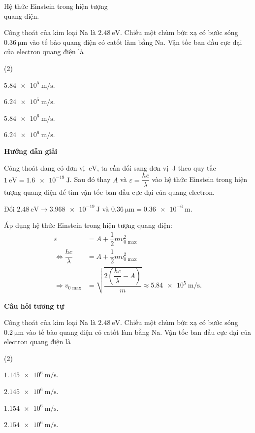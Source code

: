 \begin{dang}{Hệ thức Einstein trong hiện tượng\\ quang điện.}


{Công thoát của kim loại Na là $\SI{2.48}{\electronvolt}$. Chiếu một chùm bức xạ có bước sóng $\SI{0.36}{\micro \meter}$ vào tế bào quang điện có catốt làm bằng Na. Vận tốc ban đầu cực đại của electron quang điện là
\begin{mcq}(2)
	\item $\SI{5.84e5}{\meter / \second}$.
	\item $\SI{6.24e5}{\meter / \second}$.
	\item $\SI{5.84e6}{\meter / \second}$.
	\item $\SI{6.24e6}{\meter / \second}$.
\end{mcq}
}
{\begin{center}
	\textbf{Hướng dẫn giải}
\end{center}

Công thoát đang có đơn vị $\SI{}{\electronvolt}$, ta cần đổi sang đơn vị $\SI{}{\joule}$ theo quy tắc $\SI{1}{\electronvolt} = \SI{1.6e-19}{\joule}$. Sau đó thay $A$ và $\varepsilon = \dfrac{hc}{\lambda}$ vào hệ thức Einstein trong hiện tượng quang điện để tìm vận tốc ban đầu cực đại của quang electron.

Đổi $\SI{2.48}{\electronvolt}\rightarrow \SI{3.968e-19}{\joule}$ và $\SI{0.36}{\micro \meter} = \SI{0.36e-6}{\meter}$.

Áp dụng hệ thức Einstein trong hiện tượng quang điện:
\begin{align*}
	\varepsilon &= A + \dfrac{1}{2}mv_{\text{0 max}}^2 \\
	\Leftrightarrow \dfrac{hc}{\lambda} &= A+\dfrac{1}{2}mv_{\text{0 max}}^2 \\
	\Rightarrow v_{\text{0 max}} &= \sqrt {\dfrac{2\left(\dfrac{hc}{\lambda}-A\right)}{m}} \approx \SI{5.84e5}{\meter / \second}.
\end{align*}

\begin{center}
	\textbf{Câu hỏi tương tự}
\end{center}

Công thoát của kim loại Na là $\SI{2.48}{\electronvolt}$. Chiếu một chùm bức xạ có bước sóng $\SI{0.2}{\micro \meter}$ vào tế bào quang điện có catốt làm bằng Na. Vận tốc ban đầu cực đại của electron quang điện là
\begin{mcq}(2)
	\item $\SI{1,145 e6}{\meter / \second}$.
	\item $\SI{2,145 e6}{\meter / \second}$.
	\item $\SI{1,154 e6}{\meter / \second}$.
	\item $\SI{2,154 e6}{\meter / \second}$.
\end{mcq}

}
\end{dang}
